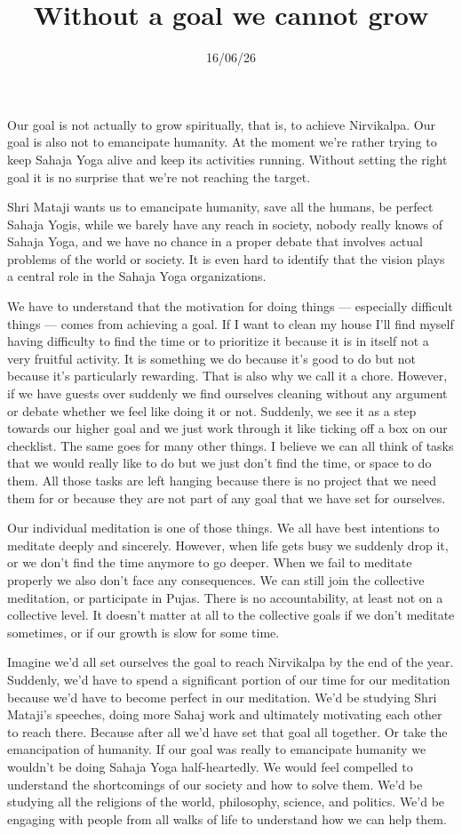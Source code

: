 \documentclass[12pt]{article}
\title{Without a goal we cannot grow}
\date{16/06/26}
\begin{document}
\maketitle

Our goal is not actually to grow spiritually, that is, to achieve Nirvikalpa.
Our goal is also not to emancipate humanity.
At the moment we're rather trying to keep Sahaja Yoga alive and keep its activities running.
Without setting the right goal it is no surprise that we're not reaching the target.

Shri Mataji wants us to emancipate humanity, save all the humans, be perfect Sahaja Yogis, while we barely have any reach in society, nobody really knows of Sahaja Yoga, and we have no chance in a proper debate that involves actual problems of the world or society.
It is even hard to identify that the vision plays a central role in the Sahaja Yoga organizations.

We have to understand that the motivation for doing things --- especially difficult things --- comes from achieving a goal.
If I want to clean my house I'll find myself having difficulty to find the time or to prioritize it because it is in itself not a very fruitful activity.
It is something we do because it's good to do but not because it's particularly rewarding.
That is also why we call it a chore.
However, if we have guests over suddenly we find ourselves cleaning without any argument or debate whether we feel like doing it or not.
Suddenly, we see it as a step towards our higher goal and we just work through it like ticking off a box on our checklist.
The same goes for many other things.
I believe we can all think of tasks that we would really like to do but we just don't find the time, or space to do them.
All those tasks are left hanging because there is no project that we need them for or because they are not part of any goal that we have set for ourselves.

Our individual meditation is one of those things.
We all have best intentions to meditate deeply and sincerely.
However, when life gets busy we suddenly drop it, or we don't find the time anymore to go deeper.
When we fail to meditate properly we also don't face any consequences.
We can still join the collective meditation, or participate in Pujas.
There is no accountability, at least not on a collective level.
It doesn't matter at all to the collective goals if we don't meditate sometimes, or if our growth is slow for some time.

Imagine we'd all set ourselves the goal to reach Nirvikalpa by the end of the year.
Suddenly, we'd have to spend a significant portion of our time for our meditation because we'd have to become perfect in our meditation.
We'd be studying Shri Mataji's speeches, doing more Sahaj work and ultimately motivating each other to reach there.
Because after all we'd have set that goal all together.
Or take the emancipation of humanity.
If our goal was really to emancipate humanity we wouldn't be doing Sahaja Yoga half-heartedly.
We would feel compelled to understand the shortcomings of our society and how to solve them.
We'd be studying all the religions of the world, philosophy, science, and politics.
We'd be engaging with people from all walks of life to understand how we can help them.
\end{document}
